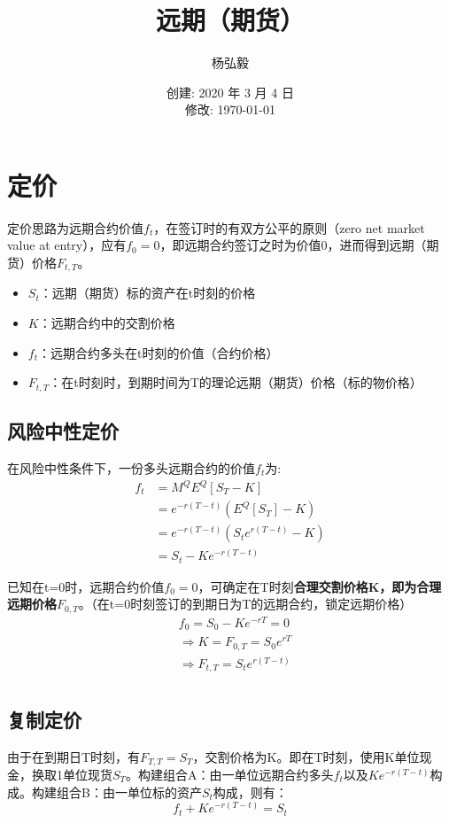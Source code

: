 \documentclass[11pt]{article}
\title{远期（期货）}
\author{杨弘毅}
\date{创建: 2020 年 3 月 4 日 \\修改: \today}
\begin{document}
\maketitle

\section{定价}
定价思路为远期合约价值$f_t$，在签订时的有双方公平的原则（zero net market value at entry），应有$f_0=0$，即远期合约签订之时为价值0，进而得到远期（期货）价格$F_{t,T}$。
\begin{itemize}
    \item $S_t$：远期（期货）标的资产在t时刻的价格
    \item $K$：远期合约中的交割价格
    \item $f_t$：远期合约多头在t时刻的价值（合约价格）
    \item $F_{t,T}$：在t时刻时，到期时间为T的理论远期（期货）价格（标的物价格）
\end{itemize}

\subsection{风险中性定价}
在风险中性条件下，一份多头远期合约的价值$f_t$为:
\begin{align*}
    f_t &= M^Q E^Q[S_T - K] \\
     &= e^{-r(T-t)} (E^Q[S_T] - K) \\
     &= e^{-r(T-t)} ( S_t e^{r(T-t)}- K) \\
     &= S_t - Ke^{-r(T-t)}
\end{align*}

已知在t=0时，远期合约价值$f_0=0$，可确定在T时刻\textbf{合理交割价格K，即为合理远期价格$F_{0,T}$}。（在t=0时刻签订的到期日为T的远期合约，锁定远期价格）
\begin{align*}
    &f_0 = S_0 - Ke^{-rT} = 0 \\
    &\Rightarrow K = F_{0,T} = S_0 e^{rT} \\
    &\Rightarrow F_{t,T} = S_t e^{r(T-t)} \\
\end{align*}

\subsection{复制定价}
由于在到期日T时刻，有$F_{T,T}=S_T$，交割价格为K。即在T时刻，使用K单位现金，换取1单位现货$S_T$。构建组合A：由一单位远期合约多头$f_t$以及$Ke^{-r(T-t)}$构成。构建组合B：由一单位标的资产$S_t$构成，则有：
\begin{equation*}
    f_t + K e^{-r(T-t)} = S_t
\end{equation*}
\end{document}
